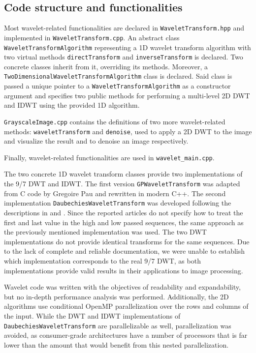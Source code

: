 \subsection{Code structure and functionalities}
Most wavelet-related functionalities are declared in \texttt{Wavelet\-Transform.hpp} and implemented in \texttt{Wavelet\-Transform.cpp}. An abstract class \texttt{Wavelet\-Transform\-Algorithm} representing a 1D wavelet transform algorithm with two virtual methods \texttt{direct\-Transform} and \texttt{inverse\-Transform} is declared. Two concrete classes inherit from it, overriding its methods. Moreover, a \texttt{Two\-Dimensional\-Wavelet\-Transform\-Algorithm} class is declared. Said class is passed a unique pointer to a \texttt{Wavelet\-Transform\-Algorithm} as a constructor argument and specifies two public methods for performing a multi-level 2D DWT and IDWT using the provided 1D algorithm.

\texttt{Grayscale\-Image.cpp} contains the definitions of two more wavelet-related methods: \texttt{wavelet\-Transform} and \texttt{denoise}, used to apply a 2D DWT to the image and visualize the result and to denoise an image respectively.

Finally, wavelet-related functionalities are used in \texttt{wavelet\_main.cpp}.

The two concrete 1D wavelet transform classes provide two implementations of the 9/7 DWT and IDWT. The first version \texttt{GP\-Wavelet\-Transform} was adapted from C code by Gregoire Pau\cite{gregoire_pau} and rewritten in modern C++. The second implementation \texttt{Daubechies\-Wavelet\-Transform} was developed following the descriptions in \cite{daubechies} and \cite{wavelet_fast_1}. Since the reported articles do not specify how to treat the first and last value in the high and low passed sequences, the same approach as the previously mentioned implementation was used. The two DWT implementations do not provide identical transforms for the same sequences. Due to the lack of complete and reliable documentation, we were unable to establish which implementation corresponds to the real 9/7 DWT, as both implementations provide valid results in their applications to image processing.

Wavelet code was written with the objectives of readability and expandability, but no in-depth performance analysis was performed. Additionally, the 2D algorithms use conditional OpenMP parallelization over the rows and columns of the input. While the DWT and IDWT implementations of \texttt{Daubechies\-Wavelet\-Transform} are parallelizable as well, parallelization was avoided, as consumer-grade architectures have a number of processors that is far lower than the amount that would benefit from this nested parallelization.

